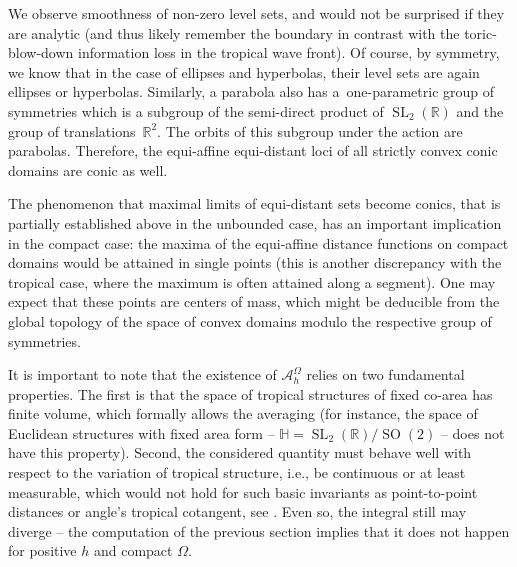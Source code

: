 \documentclass[10pt,a4paper]{amsart}
\numberwithin{equation}{section}
\theoremstyle{definition}
\renewcommand\H{\mathbb H}
\newcommand\SL{\operatorname{SL}}
\begin{document}
We observe smoothness of non-zero level sets, and would not be surprised if they are analytic (and thus likely remember the boundary in contrast with the toric-blow-down information loss in the tropical wave front). Of course, by symmetry, we know that in the case of ellipses and hyperbolas, their level sets are again ellipses or hyperbolas. Similarly, a parabola also has a~one-parametric group of symmetries which is a subgroup of the semi-direct product of $\operatorname{SL}_2(\mathbb{R})$ and the group of translations~$\mathbb{R}^2$. The orbits of this subgroup under the action are parabolas. Therefore, the equi-affine equi-distant loci of all strictly convex conic domains are conic as well.

The phenomenon that maximal limits of equi-distant sets become conics, that is partially established above in the unbounded case, has an important implication in the compact case: the maxima of the equi-affine distance functions on compact domains would be attained in single points (this is another discrepancy with the tropical case, where the maximum is often attained along a segment). One may expect that these points are centers of mass, which might be deducible from the global topology of the space of convex domains modulo the respective group of symmetries.

It is important to note that the existence of $\mathcal{A}_h^\Omega$ relies on two fundamental properties. The first is that the space of tropical structures of fixed co-area has finite volume, which formally allows the averaging (for instance, the space of Euclidean structures with fixed area form -- $\H=\SL_2(\mathbb{R})/\operatorname{SO}(2)$ -- does not have this property). Second, the considered quantity must behave well with respect to the variation of tropical structure, i.e., be continuous or at least measurable, which would not hold for such basic invariants as point-to-point distances or angle's tropical cotangent, see \cite{mikhalkin2023wave}. Even so, the integral still may diverge -- the computation of the previous section implies that it does not happen for positive $h$ and compact $\Omega$.
\end{document}
